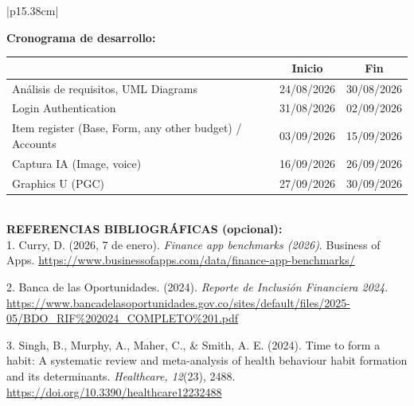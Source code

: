 \documentclass[11pt]{article}
\newcommand{\formlabel}[1]{\textbf{\small #1}}
\newcommand{\formcell}[1]{\small #1}
\begin{document}
\begin{longtable}{|p{15.38cm}|}
{\vspace{0.12cm}
\textbf{Cronograma de desarrollo:}
\vspace{0.06cm}

\small\setlength{\tabcolsep}{4pt}%
\begin{center}
\begin{tabular}[t]{|>{\raggedright\arraybackslash}p{7.5cm}|c|c|}
\hline
\multicolumn{1}{|>{\centering\arraybackslash}p{7.5cm}|}{\textbf{Actividad}} & \textbf{Inicio} & \textbf{Fin} \\
\hline
Análisis de requisitos, UML Diagrams & 24/08/2026 & 30/08/2026 \\
\hline
Login Authentication & 31/08/2026 & 02/09/2026 \\
\hline
Item register (Base, Form, any other budget) / Accounts & 03/09/2026 & 15/09/2026 \\
\hline
Captura IA (Image, voice) & 16/09/2026 & 26/09/2026 \\
\hline
Graphics U (PGC) & 27/09/2026 & 30/09/2026 \\
\hline
\end{tabular}
\end{center}
\normalsize

\vspace{0.35cm}
} \\
\hline
\formlabel{REFERENCIAS BIBLIOGRÁFICAS (opcional):} \\
\hline
\formcell{1. Curry, D. (2026, 7 de enero). \emph{Finance app benchmarks (2026)}. Business of Apps. \url{https://www.businessofapps.com/data/finance-app-benchmarks/}

2. Banca de las Oportunidades. (2024). \emph{Reporte de Inclusión Financiera 2024}. \url{https://www.bancadelasoportunidades.gov.co/sites/default/files/2025-05/BDO_RIF\%202024_COMPLETO\%201.pdf}

3. Singh, B., Murphy, A., Maher, C., \& Smith, A. E. (2024). Time to form a habit: A systematic review and meta-analysis of health behaviour habit formation and its determinants. \emph{Healthcare, 12}(23), 2488. \url{https://doi.org/10.3390/healthcare12232488}} \\
\hline
\end{longtable}
\end{document}
